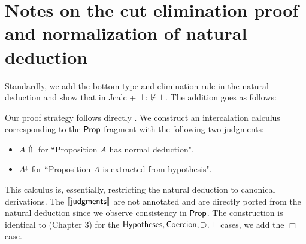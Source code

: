 \chapter{Notes on the cut elimination proof and normalization of natural deduction}
\label{norm}
Standardly, we add the bottom type and elimination rule in the natural deduction and show that in Jcalc + $\bot$: $\centernot\vdash\bot$. The addition goes as follows:

Our proof strategy follows directly \cite{pfenning2004automated}. We construct an intercalation calculus \cite{sieg1998normal} corresponding to the ${\sf Prop}$ fragment  with the following two judgments:
\begin{itemize}
	\item[] $A\Uparrow$ for ``Proposition $A$ has normal deduction".
	\item[] $A^\downarrow$ for ``Proposition $A$ is extracted from hypothesis".
\end{itemize}
This calculus is, essentially, restricting the natural deduction to canonical derivations. The $\llbracket {\sf judgments} \rrbracket$ are not annotated and are directly ported from the natural deduction since we observe consistency in ${\sf Prop}$. 
The construction is identical to \cite{pfenning2004automated} (Chapter 3) for the ${\sf Hypotheses},{\sf Coercion},\supset, \bot$ cases, we add the $\Box$ case.
